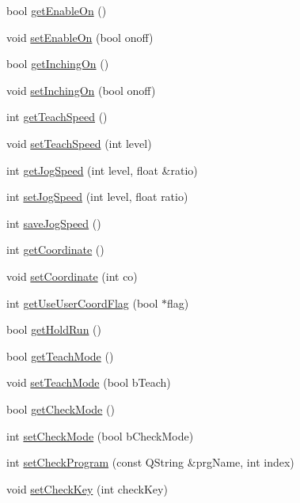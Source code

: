\begin{DoxyCompactItemize}
\item 
bool \hyperlink{classCNRobo_a1ac09bcc2a2fa67e46da6067c474fa6c}{get\-Enable\-On} ()
\item 
void \hyperlink{classCNRobo_ac771aaccd7c085c8310bb36864d27492}{set\-Enable\-On} (bool onoff)
\item 
bool \hyperlink{classCNRobo_af53f9ce8e6e68c2fe14de011d9b71074}{get\-Inching\-On} ()
\item 
void \hyperlink{classCNRobo_a9e4c9f2d4c2cb59c300c6f56bd938963}{set\-Inching\-On} (bool onoff)
\item 
int \hyperlink{classCNRobo_a3eeffd09dd1849081a6c8c036cddc36e}{get\-Teach\-Speed} ()
\item 
void \hyperlink{classCNRobo_a81f0347b4a8f4c76b06ebd27ca8a6101}{set\-Teach\-Speed} (int level)
\item 
int \hyperlink{classCNRobo_a212bd427154210d531757fafb4fe7e25}{get\-Jog\-Speed} (int level, float \&ratio)
\item 
int \hyperlink{classCNRobo_aa8a5e978725d5b36170de42f85c13ab8}{set\-Jog\-Speed} (int level, float ratio)
\item 
int \hyperlink{classCNRobo_a203fe1397f9e4f89010d9ca827d74c77}{save\-Jog\-Speed} ()
\item 
int \hyperlink{classCNRobo_af60638ed065cd859bb38843e6548b59c}{get\-Coordinate} ()
\item 
void \hyperlink{classCNRobo_a7481d9ca170f56db594a6bf26e196138}{set\-Coordinate} (int co)
\item 
int \hyperlink{classCNRobo_a3682f2719c3e17f7559d1c482ee77147}{get\-Use\-User\-Coord\-Flag} (bool $\ast$flag)
\item 
bool \hyperlink{classCNRobo_a74ef2a80cc6dc5700a0ece856d302d6a}{get\-Hold\-Run} ()
\item 
bool \hyperlink{classCNRobo_acc65e27a4e87032c9fb1f8e141b01068}{get\-Teach\-Mode} ()
\item 
void \hyperlink{classCNRobo_af233e34472550491ac1b2dda0451325c}{set\-Teach\-Mode} (bool b\-Teach)
\item 
bool \hyperlink{classCNRobo_ab070fb2c400b364ab681c07ef3efb93c}{get\-Check\-Mode} ()
\item 
int \hyperlink{classCNRobo_a149d24d4e0b50c1d1ca31ba44df9fb65}{set\-Check\-Mode} (bool b\-Check\-Mode)
\item 
int \hyperlink{classCNRobo_a8c9d5bb3e672f5f5dc92b5a087cb5e4d}{set\-Check\-Program} (const Q\-String \&prg\-Name, int index)
\item 
void \hyperlink{classCNRobo_a5b50b95aae01c6242d4c29666eaa596b}{set\-Check\-Key} (int check\-Key)

\end{DoxyCompactItemize}
